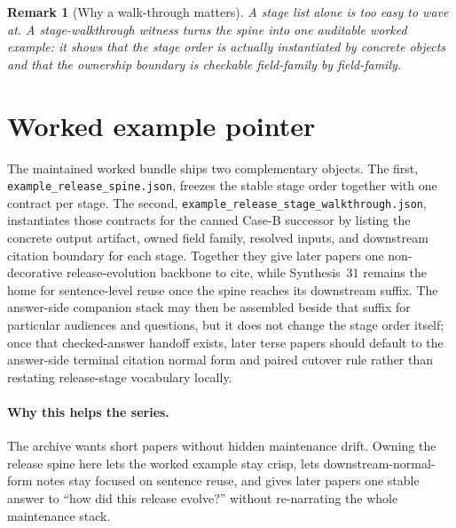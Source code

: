 \documentclass[11pt]{article}
\newtheorem{remark}{Remark}
\begin{document}
\begin{remark}[Why a walk-through matters]
A stage list alone is too easy to wave at.
A stage-walkthrough witness turns the spine into one auditable worked example: it shows that the stage order is actually instantiated by concrete objects and that the ownership boundary is checkable field-family by field-family.
\end{remark}

\section{Worked example pointer}
The maintained worked bundle ships two complementary objects.\cite{series:workedexample}
The first, \texttt{example\_release\_spine.json}, freezes the stable stage order together with one contract per stage.
The second, \texttt{example\_release\_stage\_walkthrough.json}, instantiates those contracts for the canned Case-B successor by listing the concrete output artifact, owned field family, resolved inputs, and downstream citation boundary for each stage.
Together they give later papers one non-decorative release-evolution backbone to cite, while Synthesis~31 remains the home for sentence-level reuse once the spine reaches its downstream suffix. The answer-side companion stack may then be assembled beside that suffix for particular audiences and questions, but it does not change the stage order itself; once that checked-answer handoff exists, later terse papers should default to the answer-side terminal citation normal form and paired cutover rule rather than restating release-stage vocabulary locally.\cite{series:challengeanswercapsules,series:challengeanswersheets,series:challengeanswercards,series:challengeanswercarrierslots,series:challengeansweraudittrails,series:challengeanswercitationdockets,series:challengeanswerpublicationprofiles,series:challengeanswerdisclosurepackets,series:challengeanswerescalationladders,series:challengeanswerreviewmenus,series:pairedterminalcitationdiscipline,series:pairedterminalcutoverrules}

\paragraph{Why this helps the series.}
The archive wants short papers without hidden maintenance drift.
Owning the release spine here lets the worked example stay crisp, lets downstream-normal-form notes stay focused on sentence reuse, and gives later papers one stable answer to ``how did this release evolve?'' without re-narrating the whole maintenance stack.
\end{document}
